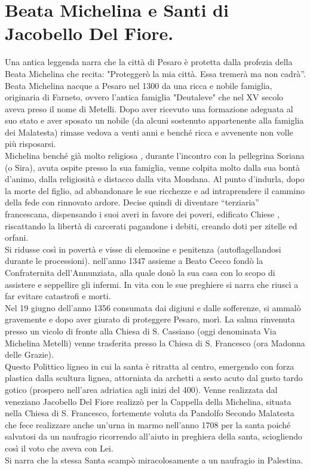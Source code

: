 \documentclass[12pt,a4paper]{article}
\begin{document}
	\section{Beata Michelina e Santi di Jacobello Del Fiore.}
	Una antica leggenda narra che la città di Pesaro è protetta dalla profezia della Beata Michelina che recita: "Proteggerò la mia città. Essa tremerà ma non cadrà”.\\
	Beata Michelina nacque a Pesaro nel 1300 da una ricca e nobile famiglia, originaria di Farneto, ovvero l’antica famiglia "Deutaleve" che nel XV secolo aveva preso il nome di Metelli. Dopo aver ricevuto una formazione adeguata al suo stato e aver sposato un nobile (da alcuni sostenuto appartenente alla famiglia dei Malatesta) rimase vedova a venti anni e benché ricca e avvenente non volle più risposarsi.\\
	Michelina benché già molto religiosa , durante l'incontro con la  pellegrina Soriana (o Sira), avuta ospite presso la sua famiglia, venne colpita molto dalla sua bontà d'animo, dalla religiosità e distacco dalla vita Mondana. Al punto d'indurla, dopo la morte del figlio, ad abbandonare le sue ricchezze e ad intraprendere il cammino della fede con rinnovato ardore. Decise quindi di diventare “terziaria” francescana, dispensando i suoi averi in favore dei poveri, edificato Chiese , riscattando la libertà di carcerati pagandone i debiti, creando doti per zitelle ed orfani.\\
	Si ridusse così in povertà e visse di elemosine e penitenza (autoflagellandosi durante le processioni). nell'anno 1347 assieme a Beato Cecco fondò la Confraternita dell'Annunziata, alla quale donò la sua casa con lo scopo di assistere e seppellire gli infermi. In vita con le sue preghiere si narra che riuscì a far evitare catastrofi e morti.\\
	Nel 19 giugno dell'anno 1356 consumata dai digiuni e dalle sofferenze, si ammalò gravemente e dopo aver giurato di proteggere Pesaro, morì. La salma rinvenuta presso un vicolo di fronte alla Chiesa di S. Cassiano (oggi denominata Via Michelina Metelli) venne trasferita presso la Chiesa di S. Francesco (ora Madonna delle Grazie).\\
	Questo Polittico ligneo in cui la santa è ritratta al centro, emergendo con forza plastica dalla scultura lignea, attorniata da archetti a sesto acuto dal gusto tardo gotico (prospero nell'area adriatica agli inizi del 400). Venne realizzata dal veneziano Jacobello Del Fiore realizzò per la Cappella della Michelina, situata nella Chiesa di S. Francesco, fortemente voluta da Pandolfo Secondo Malatesta che fece realizzare anche un'urna in marmo nell'anno 1708 per la santa poiché salvatosi da un naufragio ricorrendo all'aiuto in preghiera della santa, sciogliendo così il voto che aveva con Lei.\\
	Si narra che la stessa Santa scampò miracolosamente a un naufragio in Palestina.
	
\end{document}
